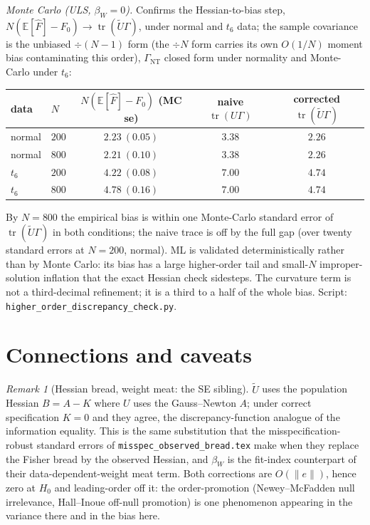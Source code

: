 \documentclass[11pt]{article}
\newcommand{\E}{\mathbb{E}}
\newcommand{\tr}{\operatorname{tr}}
\theoremstyle{plain}
\theoremstyle{remark}
\newtheorem*{remark}{Remark}
\begin{document}
\emph{Monte Carlo (ULS, $\beta_W=0$).} Confirms the Hessian-to-bias step,
$N(\E[\hat F]-F_0)\to\tr(\tilde U\Gamma)$, under normal and $t_6$ data; the sample
covariance is the unbiased $\div(N{-}1)$ form (the $\div N$ form carries its own
$O(1/N)$ moment bias contaminating this order), $\Gamma_{\mathrm{NT}}$ closed form
under normality and Monte-Carlo under $t_6$:
\begin{center}
\begin{tabular}{llccc}
data & $N$ & $N(\E[\hat F]-F_0)$ (MC se) & naive $\tr(U\Gamma)$ & corrected $\tr(\tilde U\Gamma)$\\
\hline
normal & $200$ & $2.23\ (0.05)$ & $3.38$ & $\mathbf{2.26}$\\
normal & $800$ & $2.21\ (0.10)$ & $3.38$ & $\mathbf{2.26}$\\
$t_6$  & $200$ & $4.22\ (0.08)$ & $7.00$ & $\mathbf{4.74}$\\
$t_6$  & $800$ & $4.78\ (0.16)$ & $7.00$ & $\mathbf{4.74}$\\
\end{tabular}
\end{center}
By $N=800$ the empirical bias is within one Monte-Carlo standard error of
$\tr(\tilde U\Gamma)$ in both conditions; the naive trace is off by the full gap
(over twenty standard errors at $N=200$, normal). ML is validated
deterministically rather than by Monte Carlo: its bias has a large higher-order
tail and small-$N$ improper-solution inflation that the exact Hessian check
sidesteps. The curvature term is not a third-decimal refinement; it is a third to
a half of the whole bias. Script:
\texttt{higher\_order\_discrepancy\_check.py}.

\section{Connections and caveats}

\begin{remark}[Hessian bread, weight meat: the SE sibling]
$\tilde U$ uses the population Hessian $B=A-K$ where $U$ uses the Gauss--Newton
$A$; under correct specification $K=0$ and they agree, the discrepancy-function
analogue of the information equality. This is the same substitution that the
misspecification-robust standard errors of \texttt{misspec\_observed\_bread.tex}
make when they replace the Fisher bread by the observed Hessian, and $\beta_W$ is
the fit-index counterpart of their data-dependent-weight meat term. Both
corrections are $O(\|e\|)$, hence zero at $H_0$ and leading-order off it: the
order-promotion (Newey--McFadden null irrelevance, Hall--Inoue off-null
promotion) is one phenomenon appearing in the variance there and in the bias
here.
\end{remark}
\end{document}
